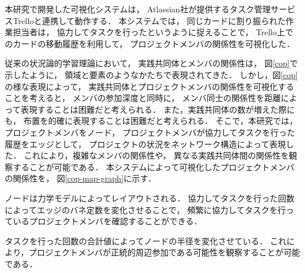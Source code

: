 

本研究で開発した可視化システムは，
Atlassian社が提供するタスク管理サービスTrello\cite{trello}と連携して動作する．
本システムでは，
同じカードに割り振られた作業担当者は，
協力してタスクを行ったというように捉えることで，
Trello上でのカードの移動履歴を利用して，
プロジェクトメンバの関係性を可視化した．

従来の状況論的学習理論において，
実践共同体とメンバの関係性は，
図\ref{cop}で示したように，
領域と要素のようなかたちで表現されてきた．
しかし，図\ref{cop}の様な表現によって，
実践共同体とプロジェクトメンバの関係性を可視化することを考えると，
メンバの参加深度と同時に，
メンバ同士の関係性を距離によって表現することは困難だと考えられる．
また，実践共同体の数が増えた際にも，
布置を的確に表現することは困難だと考えられる．
そこで，本研究では，
プロジェクトメンバをノード，
プロジェクトメンバが協力してタスクを行った履歴をエッジとして，
プロジェクトの状況をネットワーク構造によって表現した．
これにより，複雑なメンバの関係性や，
異なる実践共同体間の関係性を観察することが可能である．
本システムによって可視化したプロジェクトメンバの関係性を，
図\ref{cop-map-graph}に示す．

ノードは力学モデルによってレイアウトされる．
協力してタスクを行った回数によってエッジのバネ定数を変化させることで，
頻繁に協力してタスクを行っているプロジェクトメンバを確認することができる．

タスクを行った回数の合計値によってノードの半径を変化させている．
これにより，プロジェクトメンバが正統的周辺参加である可能性を観察することが可能である．

